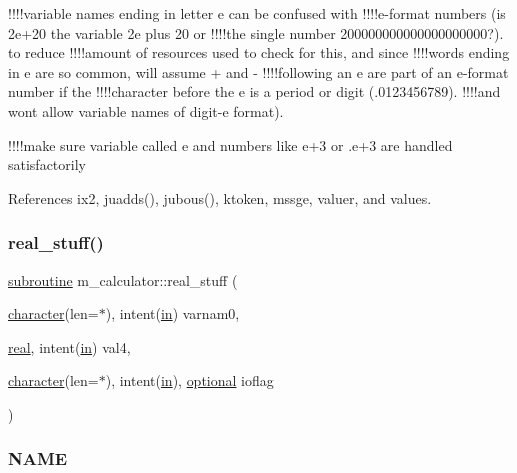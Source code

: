 !!!!variable names ending in letter e can be confused with !!!!e-\/format numbers (is 2e+20 the variable 2e plus 20 or !!!!the single number 200000000000000000000?). to reduce !!!!amount of resources used to check for this, and since !!!!words ending in e are so common, will assume + and -\/ !!!!following an e are part of an e-\/format number if the !!!!character before the e is a period or digit (.0123456789). !!!!and won\textquotesingle{}t allow variable names of digit-\/e format).

!!!!make sure variable called e and numbers like e+3 or .e+3 are handled satisfactorily 

References ix2, juadds(), jubous(), ktoken, mssge, valuer, and values.

\mbox{\label{namespacem__calculator_a8337bfb59665d3236fed48d316e3701b}} 
\subsubsection{\texorpdfstring{real\+\_\+stuff()}{real\_stuff()}}
{\footnotesize\ttfamily \hyperlink{M__stopwatch_83_8txt_acfbcff50169d691ff02d4a123ed70482}{subroutine} m\+\_\+calculator\+::real\+\_\+stuff (\begin{DoxyParamCaption}\item[{\hyperlink{option__stopwatch_83_8txt_abd4b21fbbd175834027b5224bfe97e66}{character}(len=$\ast$), intent(\hyperlink{M__journal_83_8txt_afce72651d1eed785a2132bee863b2f38}{in})}]{varnam0,  }\item[{\hyperlink{read__watch_83_8txt_abdb62bde002f38ef75f810d3a905a823}{real}, intent(\hyperlink{M__journal_83_8txt_afce72651d1eed785a2132bee863b2f38}{in})}]{val4,  }\item[{\hyperlink{option__stopwatch_83_8txt_abd4b21fbbd175834027b5224bfe97e66}{character}(len=$\ast$), intent(\hyperlink{M__journal_83_8txt_afce72651d1eed785a2132bee863b2f38}{in}), \hyperlink{option__stopwatch_83_8txt_aa4ece75e7acf58a4843f70fe18c3ade5}{optional}}]{ioflag }\end{DoxyParamCaption})\hspace{0.3cm}{\ttfamily [private]}}



\subsubsection*{N\+A\+ME}

